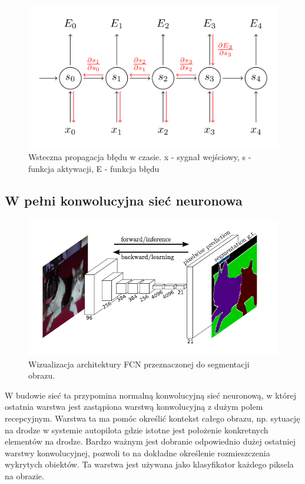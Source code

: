 \documentclass[12pt,a4paper,twoside,titlepage,openright]{book}
\begin{document}
\begin{figure}[ht]
	\centering
			\includegraphics[resolution=100]{backpropagationThroughTime.png}
		\caption{Wsteczna propagacja błędu w czasie. x - sygnał wejściowy, s - funkcja aktywacji, E - funkcja błędu}
\end{figure}

\subsection{W pełni konwolucyjna sieć neuronowa}

\begin{figure}[ht]
	\centering
			\includegraphics[resolution=100]{fullyConvolutionalNetwork.png}
		\caption{Wizualizacja architektury FCN przeznaczonej do segmentacji obrazu.}
\end{figure}
W budowie sieć ta przypomina normalną konwolucyjną sieć neuronową, w której ostatnia warstwa jest zastąpiona warstwą konwolucyjną z dużym polem recepcyjnym. Warstwa ta ma pomóc określić kontekst całego obrazu, np. sytuację na drodze w systemie autopilota gdzie istotne jest położenie konkretnych elementów na drodze. Bardzo ważnym jest dobranie odpowiednio dużej ostatniej warstwy konwolucyjnej, pozwoli to na dokładne określenie rozmieszczenia wykrytych obiektów. Ta warstwa jest używana jako klasyfikator każdego piksela na obrazie.
\end{document}

